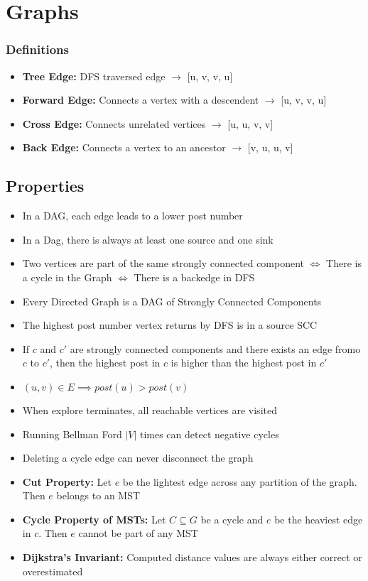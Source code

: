 \documentclass{article}
\begin{document}
\section*{Graphs}
\subsubsection*{Definitions}
\begin{itemize}
    \item \textbf{Tree Edge:} DFS traversed edge $\rightarrow$ [u, v, v, u]
    \item \textbf{Forward Edge:} Connects a vertex with a descendent $\rightarrow$ [u, v, v, u]
    \item \textbf{Cross Edge:} Connects unrelated vertices $\rightarrow$ [u, u, v, v]
    \item \textbf{Back Edge:} Connects a vertex to an ancestor $\rightarrow$ [v, u, u, v]
\end{itemize}
\subsection*{Properties}
\begin{itemize}
    \item In a DAG, each edge leads to a lower post number
    \item In a Dag, there is always at least one source and one sink
    \item Two vertices are part of the same strongly connected component $\Leftrightarrow$ There is a cycle in the Graph $\Leftrightarrow$ There is a backedge in DFS
    \item Every Directed Graph is a DAG of Strongly Connected Components
    \item The highest post number vertex returns by DFS is in a source SCC
    \item If $c$ and $c'$ are strongly connected components and there exists an edge fromo $c$ to $c'$, then the highest post in $c$ is higher than the highest post in $c'$
    \item $(u,v)\in E \implies post(u) > post(v)$
    \item When explore terminates, all reachable vertices are visited
    \item Running Bellman Ford $|V|$ times can detect negative cycles
    \item Deleting a cycle edge can never disconnect the graph
    \item \textbf{Cut Property:} Let $e$ be the lightest edge across any partition of the graph. Then $e$ belongs to an MST
    \item \textbf{Cycle Property of MSTs:} Let $C\subseteq G$ be a cycle and $e$ be the heaviest edge in $c$. Then $e$ cannot be part of any MST
    \item \textbf{Dijkstra's Invariant: } Computed distance values are always either correct or overestimated
\end{itemize}
\end{document}
